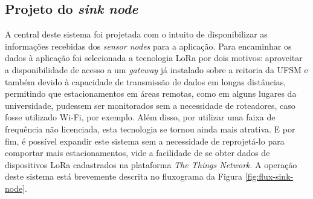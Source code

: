 \documentclass[oneside,openright,12pt]{ufsm_2015} %
\begin{document}
    
    
    
    \subsection{Projeto do \textit{sink node}}
    A central deste sistema foi projetada com o intuito de disponibilizar as informações recebidas dos \textit{sensor nodes} para a aplicação. Para encaminhar os dados à aplicação foi selecionada a tecnologia LoRa por dois motivos: aproveitar a disponibilidade de acesso a um \textit{gateway} já instalado sobre a reitoria da UFSM e também devido à capacidade de transmissão de dados em longas distâncias, permitindo que estacionamentos em áreas remotas, como em alguns lugares da universidade, pudessem ser monitorados sem a necessidade de roteadores, caso fosse utilizado Wi-Fi, por exemplo. Além disso, por utilizar uma faixa de frequência não licenciada, esta tecnologia se tornou ainda mais atrativa. E por fim, é possível expandir este sistema sem a necessidade de reprojetá-lo para comportar mais estacionamentos, vide a facilidade de se obter dados de dispositivos LoRa cadastrados na plataforma \textit{The Things Network}. A operação deste sistema está brevemente descrita no fluxograma da Figura \ref{fig:flux-sink-node}.
    
\end{document}
